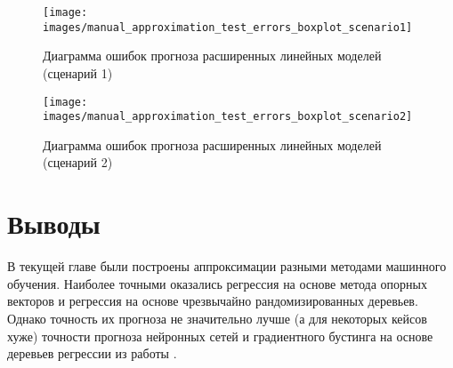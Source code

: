 \begin{figure}[H] 
	\center
	\texttt{[image: images/manual\_approximation\_test\_errors\_boxplot\_scenario1]}
	\caption{Диаграмма ошибок прогноза расширенных линейных моделей (сценарий 1)} 
	\label{fig:manual-reg-1}
\end{figure}

\begin{figure}[H] 
	\center
	\texttt{[image: images/manual\_approximation\_test\_errors\_boxplot\_scenario2]}
	\caption{Диаграмма ошибок прогноза расширенных линейных моделей (сценарий 2)} 
	\label{fig:manual-reg-2}
\end{figure}


\section{Выводы} \label{ch1:conclusion}

В текущей главе были построены аппроксимации разными методами машинного обучения. Наиболее точными оказались регрессия на основе метода опорных векторов и регрессия на основе чрезвычайно рандомизированных деревьев. Однако точность их прогноза не значительно лучше (а для некоторых кейсов хуже) точности прогноза нейронных сетей и градиентного бустинга на основе деревьев регрессии из работы \cite{muravtsev:metamodel}.




